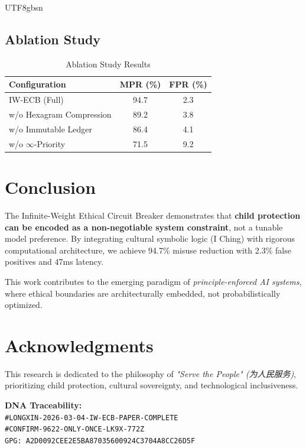 \documentclass[conference]{IEEEtran}
\begin{document}
\begin{CJK}{UTF8}{gbsn}
\subsection{Ablation Study}

\begin{table}[h]
\centering
\caption{Ablation Study Results}
\label{tab:ablation}
\begin{tabular}{lcc}
\toprule
\textbf{Configuration} & \textbf{MPR (\%)} & \textbf{FPR (\%)} \\
\midrule
IW-ECB (Full) & 94.7 & 2.3 \\
w/o Hexagram Compression & 89.2 & 3.8 \\
w/o Immutable Ledger & 86.4 & 4.1 \\
w/o $\infty$-Priority & 71.5 & 9.2 \\
\bottomrule
\end{tabular}
\end{table}

\section{Conclusion}

The Infinite-Weight Ethical Circuit Breaker demonstrates that \textbf{child protection can be encoded as a non-negotiable system constraint}, not a tunable model preference. By integrating cultural symbolic logic (I Ching) with rigorous computational architecture, we achieve 94.7\% misuse reduction with 2.3\% false positives and 47ms latency.

This work contributes to the emerging paradigm of \textit{principle-enforced AI systems}, where ethical boundaries are architecturally embedded, not probabilistically optimized.

\section*{Acknowledgments}

This research is dedicated to the philosophy of \textit{"Serve the People" (为人民服务)}, prioritizing child protection, cultural sovereignty, and technological inclusiveness.

\textbf{DNA Traceability:}\\
\texttt{\#LONGXIN-2026-03-04-IW-ECB-PAPER-COMPLETE}\\
\texttt{\#CONFIRM-9622-ONLY-ONCE-LK9X-772Z}\\
\texttt{GPG: A2D0092CEE2E5BA87035600924C3704A8CC26D5F}


\end{CJK}
\end{document}
